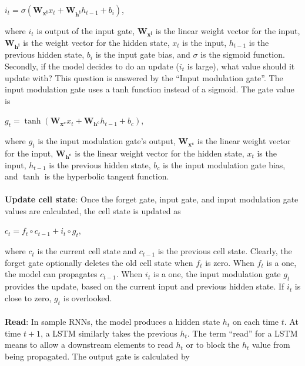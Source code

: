 \hfil $ i_t = \sigma(\mathbf{W_{x^i}}x_t + \mathbf{W_{h^i}}h_{t-1} + b_i) $, \par

where $i_t$ is output of the input gate, $\mathbf{W_{x^i}}$ is the linear weight vector for the input, $\mathbf{W_{h^i}}$ is the weight vector for the hidden state, $x_t$ is the input, $h_{t-1}$ is the previous hidden state, $b_i$ is the input gate bias, and $\sigma$ is the sigmoid function. Secondly, if the model decides to do an update ($i_t$ is large), what value should it update with? This question is answered by the “Input modulation gate”. The input modulation gate uses a tanh function instead of a sigmoid. The gate value is 

\hfil $ g_t = \tanh(\mathbf{W_{x^c}}x_t + \mathbf{W_{h^c}}h_{t-1} + b_c) $, \par 

where $g_t$ is the input modulation gate's output, $\mathbf{W_{x^c}}$ is the linear weight vector for the input, $\mathbf{W_{h^c}}$ is the linear weight vector for the hidden state, $x_t$ is the input, $h_{t-1}$ is the previous hidden state, $b_c$ is the input modulation gate bias, and $\tanh$ is the hyperbolic tangent function.

\paragraph{}
\textbf{Update cell state}: Once the forget gate, input gate, and input modulation gate values are calculated, the cell state is updated as

\hfil $c_t = f_t \circ c_{t-1} + i_t \circ g_t $, \par 

where $c_t$ is the current cell state and $c_{t-1}$ is the previous cell state. Clearly, the forget gate optionally deletes the old cell state when $f_t$ is zero. When $f_t$ is a one, the model can propagates $c_{t -1}$. When $i_t$ is a one, the input modulation gate $g_t$ provides the update, based on the current input and previous hidden state. If $i_t$ is close to zero, $g_t$ is overlooked.

\paragraph{}
\textbf{Read}: In sample RNNs, the model produces a hidden state $h_t$ on each time $t$. At  time $t+1$, a LSTM similarly takes the previous $h_t$. The term “read” for a LSTM means to allow a downstream elements to read $h_t$ or to block the $h_t$ value from being propagated. The output gate is calculated by

